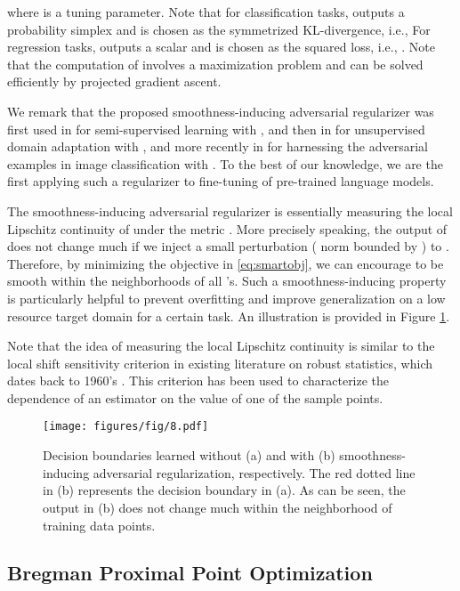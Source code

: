 \documentclass[11pt]{article} \usepackage{url}
\begin{document}
where  is a tuning parameter. Note that for classification tasks,  outputs a probability simplex and  is chosen as the symmetrized KL-divergence, i.e.,  For regression tasks,  outputs a scalar and  is chosen as the squared loss, i.e., . Note that the computation of  involves a maximization problem and can be solved efficiently by  projected gradient ascent. 

We remark that the proposed smoothness-inducing adversarial regularizer was first used in \citet{miyato2018virtual} for semi-supervised learning with , and then in \citet{shu2018dirt} for unsupervised domain adaptation with , and more recently in \citet{zhang2019theoretically} for harnessing the adversarial examples in image classification with . To the best of our knowledge,
we are the first applying such a regularizer to fine-tuning of pre-trained language models.

The smoothness-inducing adversarial regularizer is essentially measuring the local Lipschitz continuity of  under the metric . More precisely speaking, the output of  does not change much if we inject a small perturbation ( norm bounded by ) to . Therefore, by minimizing the objective in \eqref{eq:smartobj}, we can encourage  to be smooth within the neighborhoods of all 's. Such a smoothness-inducing property is particularly helpful to prevent overfitting and improve generalization on a low resource target domain for a certain task. An illustration is provided in Figure \ref{fig:TRADES}.

Note that the idea of measuring the local Lipschitz continuity is similar to the local shift sensitivity criterion in existing literature on robust statistics, which dates back to 1960's \cite{hampel1974influence,huber2011robust}. This criterion has been used to characterize the dependence of an estimator on the value of one of the sample points.

\begin{figure}[htb!]
\centering
\texttt{[image: figures/fig/8.pdf]}
\caption{\label{fig:TRADES} Decision boundaries learned without (a) and with (b) smoothness-inducing adversarial regularization, respectively. 
The red dotted line in (b) represents the decision boundary in (a). 
As can be seen, the output  in (b) does not change much within the neighborhood of training data points.}
\vspace{-0.2in}
\end{figure}

\subsection{Bregman Proximal Point Optimization}
\end{document}
